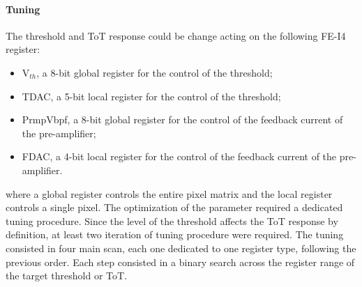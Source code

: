 
\paragraph{Tuning}
The threshold and ToT response could be change acting on the following FE-I4 register:
\begin{itemize}
\item V$_{th}$, a 8-bit global register for the control of the threshold;
\item	TDAC, a 5-bit local register for the control of the threshold;
\item PrmpVbpf, a 8-bit global register for the control of the feedback current of the pre-amplifier;
\item FDAC, a 4-bit local register for the control of the feedback current of the pre-amplifier.
\end{itemize}
where a global register controls the entire pixel matrix and the local register controls a single pixel.
The optimization of the parameter required a dedicated tuning procedure. Since the level of the threshold affects the ToT response by definition, at least two iteration of tuning procedure were required. 
The tuning consisted in four main scan, each one dedicated to one register type, following the previous order. Each step consisted in a binary search across the register range of the target threshold or ToT.

